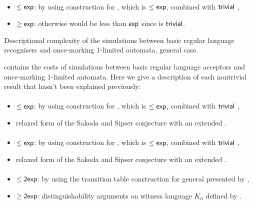 \paragraph{\ODLA{}\tto\TDFA}
\begin{itemize}
	\item $\le\mathsf{exp}$: by using construction for \hyperref[cost:1DLAto1DFA]{\ODLA{}\tto\ODFA}, which is $\le\mathsf{exp}$, combined with $\mathsf{trivial}$ \ODFA{}\tto\TDFA,
	\item $\ge\mathsf{exp}$: otherwise \hyperref[cost:1DLAto2NFA]{\ODLA{}\tto\TNFA} would be less than $\mathsf{exp}$ since \TDFA{}\tto\TNFA is $\mathsf{trivial}$.
\end{itemize}


\begin{table}
	\centering
	\caption{Descriptional complexity of the simulations between basic regular language recognisers and once-marking $1$-limited automata, general case.}
	\label{tab:sims-om-general}
\end{table}

 contains the costs of simulations between basic regular language acceptors and once-marking $1$-limited automata.
Here we give a description of each nontrivial result that hasn't been explained previously:

\paragraph{\ONFA{}\tto\OMODLA}
\begin{itemize}
	\item $\le\mathsf{exp}$: by using construction for \hyperref[cost:1NFAto1DFA]{\ONFA{}\tto\ODFA}, which is $\le\mathsf{exp}$, combined with $\mathsf{trivial}$ \ODFA{}\tto\OMODLA,
	\item relaxed form of the Sakoda and Sipser conjecture with an extended \TDFA.
\end{itemize}
\paragraph{\TNFA{}\tto\OMODLA}
\begin{itemize}
	\item $\le\mathsf{exp}$: by using construction for \hyperref[cost:2NFAto1DFA]{\TNFA{}\tto\ODFA}, which is $\le\mathsf{exp}$, combined with $\mathsf{trivial}$ \ODFA{}\tto\OMODLA,
	\item relaxed form of the Sakoda and Sipser conjecture with an extended \TDFA.
\end{itemize}
\paragraph{\OMOLA{}\tto\ODFA}\label{cost:OM1LAto1DFA}
\begin{itemize}
	\item $\le\mathsf{2exp}$: by using the transition table construction for general \OLAs presented by ,
	\item $\ge\mathsf{2exp}$: distinguishability arguments on witness language $K_n$ defined by .
\end{itemize}
